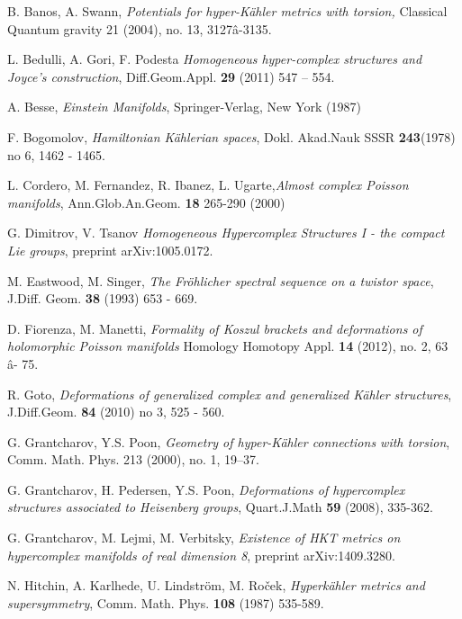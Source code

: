 \documentclass[11pt,oneside,leqno]{amsart}
\theoremstyle{plain}
\theoremstyle{definition}
\begin{document}
\begin{thebibliography}{12}

 B. Banos, A. Swann, {\em Potentials for hyper-K\"ahler metrics with torsion,}
Classical Quantum gravity 21 (2004), no. 13, 3127â-3135.
\smallskip

 L. Bedulli, A. Gori, F. Podesta {\it Homogeneous hyper-complex structures and Joyce's construction}, Diff.Geom.Appl. {\bf 29} (2011) 547 -- 554.
\smallskip

A. Besse, {\em Einstein Manifolds}, Springer-Verlag, New York (1987)
\smallskip

 F. Bogomolov, {\it Hamiltonian K\"ahlerian spaces}, Dokl. Akad.Nauk SSSR {\bf 243}(1978) no 6, 1462 - 1465.
\smallskip

 L. Cordero, M. Fernandez, R. Ibanez, L. Ugarte,{\em Almost complex Poisson manifolds}, Ann.Glob.An.Geom. {\bf 18} 265-290 (2000)
\smallskip

 G. Dimitrov, V. Tsanov {\it Homogeneous Hypercomplex Structures I - the compact Lie groups}, preprint  arXiv:1005.0172.
\smallskip

 M. Eastwood, M. Singer, {\it The Fr\"ohlicher spectral sequence on a twistor space}, J.Diff. Geom. {\bf 38} (1993) 653 - 669.
\smallskip

 D. Fiorenza, M. Manetti, {\it  Formality of Koszul brackets and deformations of holomorphic Poisson manifolds} Homology Homotopy Appl. {\bf 14} (2012), no. 2, 63 â- 75.
\smallskip

 R. Goto, {\it Deformations of generalized complex and generalized K\"ahler structures}, J.Diff.Geom. {\bf 84} (2010) no 3, 525 - 560.

 G. Grantcharov, Y.S. Poon, {\em Geometry of
  hyper-K\"ahler connections with torsion},
Comm. Math. Phys. 213 (2000), no. 1, 19--37.
\smallskip

  G. Grantcharov, H. Pedersen, Y.S. Poon, {\em Deformations of hypercomplex structures associated to Heisenberg groups}, Quart.J.Math {\bf 59} (2008), 335-362.
\smallskip

 G. Grantcharov, M. Lejmi, M. Verbitsky, {\em Existence of HKT metrics on hypercomplex manifolds of real dimension 8}, preprint arXiv:1409.3280.
\smallskip

 N. Hitchin, A. Karlhede, U. Lindstr\"{o}m, M. Ro\v{c}ek, {\em Hyperk\"ahler metrics and supersymmetry},  Comm. Math. Phys. {\bf 108} (1987) 535-589.
\smallskip


\end{thebibliography}
\end{document}

